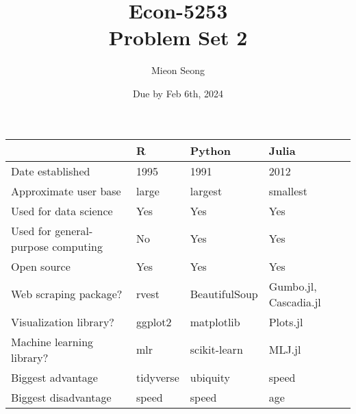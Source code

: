 \documentclass[12pt, letterpaper]{article}
\title{Econ-5253\\
{Problem Set 2}  \\
\large  \vspace{-1em}}
\author{Mieon Seong}
\date{Due by Feb 6th, 2024}
\begin{document}
\setlength{\abovedisplayskip}{5pt}
\setlength{\belowdisplayskip}{5pt}
\setlength{\abovedisplayshortskip}{5pt}
\setlength{\belowdisplayshortskip}{5pt}

\maketitle

\begin{table}[]
\begin{tabular}{|l|l|l|l|}
\hline
                                   & R         & Python        & Julia                 \\ \hline
Date established                   & 1995      & 1991          & 2012                  \\ \hline
Approximate user base              & large     & largest       & smallest              \\ \hline
Used for data science              & Yes       & Yes           & Yes                   \\ \hline
Used for general-purpose computing & No        & Yes           & Yes                   \\ \hline
Open source                        & Yes       & Yes           & Yes                   \\ \hline
Web scraping package?              & rvest     & BeautifulSoup & Gumbo.jl, Cascadia.jl \\ \hline
Visualization library?             & ggplot2   & matplotlib    & Plots.jl              \\ \hline
Machine learning library?          & mlr       & scikit-learn  & MLJ.jl                \\ \hline
Biggest advantage                  & tidyverse & ubiquity      & speed                 \\ \hline
Biggest disadvantage               & speed     & speed         & age                   \\ \hline
\end{tabular}
\end{table}
\end{document}
